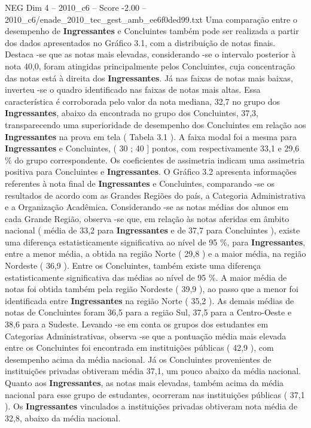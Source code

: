 \begin{textsample}{NEG Dim 4 – 2010\_c6 – Score -2.00 – 2010\_c6/enade\_2010\_tec\_gest\_amb\_ee6f0ded99.txt}
Uma comparação entre o desempenho de \textbf{Ingressantes} e Concluintes também pode ser realizada a partir dos dados apresentados no Gráfico 3.1, com a distribuição de notas finais.
Destaca -se que as notas mais elevadas, considerando -se o intervalo posterior à nota 40,0, foram atingidas principalmente pelos Concluintes, cuja concentração das notas está à direita dos \textbf{Ingressantes}.
Já nas faixas de notas mais baixas, inverteu -se o quadro identificado nas faixas de notas mais altas.
Essa característica é corroborada pelo valor da nota mediana, 32,7 no grupo dos \textbf{Ingressantes}, abaixo da encontrada no grupo dos Concluintes, 37,3, transparecendo uma superioridade de desempenho dos Concluintes em relação aos \textbf{Ingressantes} na prova em tela ( Tabela 3.1 ).
A faixa modal foi a mesma para \textbf{Ingressantes} e Concluintes, ( 30 ; 40 ] pontos, com respectivamente 33,1 e 29,6 \% do grupo correspondente.
Os coeficientes de assimetria indicam uma assimetria positiva para Concluintes e \textbf{Ingressantes}.
O Gráfico 3.2 apresenta informações referentes à nota final de \textbf{Ingressantes} e Concluintes, comparando -se os resultados de acordo com as Grandes Regiões do país, a Categoria Administrativa e a Organização Acadêmica.
Considerando -se as notas médias dos alunos em cada Grande Região, observa -se que, em relação às notas aferidas em âmbito nacional ( média de 33,2 para \textbf{Ingressantes} e de 37,7 para Concluintes ), existe uma diferença estatisticamente significativa ao nível de 95 \%, para \textbf{Ingressantes}, entre a menor média, a obtida na região Norte ( 29,8 ) e a maior média, na região Nordeste ( 36,9 ).
Entre os Concluintes, também existe uma diferença estatisticamente significativa das médias ao nível de 95 \%.
A maior média de notas foi obtida também pela região Nordeste ( 39,9 ), ao passo que a menor foi identificada entre \textbf{Ingressantes} na região Norte ( 35,2 ).
As demais médias de notas de Concluintes foram 36,5 para a região Sul, 37,5 para a Centro-Oeste e 38,6 para a Sudeste.
Levando -se em conta os grupos dos estudantes em Categorias Administrativas, observa -se que a pontuação média mais elevada entre os Concluintes foi encontrada em instituições públicas ( 42,9 ), com desempenho acima da média nacional.
Já os Concluintes provenientes de instituições privadas obtiveram média 37,1, um pouco abaixo da média nacional.
Quanto aos \textbf{Ingressantes}, as notas mais elevadas, também acima da média nacional para esse grupo de estudantes, ocorreram nas instituições públicas ( 37,1 ).
Os \textbf{Ingressantes} vinculados a instituições privadas obtiveram nota média de 32,8, abaixo da média nacional.

\end{textsample}
